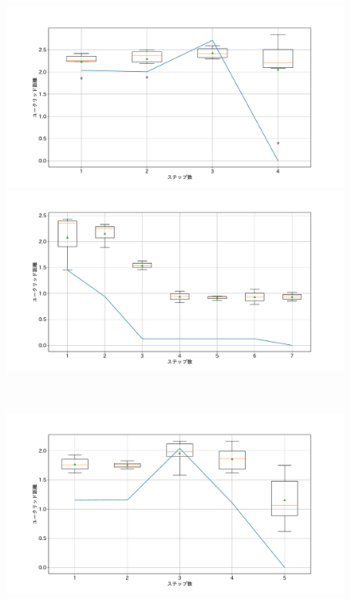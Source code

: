 \begin{figure}[h]
 \begin{minipage}[b]{0.48\linewidth}
  \centering
  \includegraphics[scale=0.15]{./imgs/gaChange/sofa1_9.pdf}
 \end{minipage}
 \begin{minipage}[b]{0.48\linewidth}
  \centering
  \includegraphics[scale=0.15]{./imgs/gaChange/sofa2_9.pdf}
 \end{minipage}\\
 \begin{minipage}[b]{0.48\linewidth}
  \centering
  \includegraphics[scale=0.15]{./imgs/gaChange/sofa1_10.pdf}

\end{minipage}
\end{figure}
